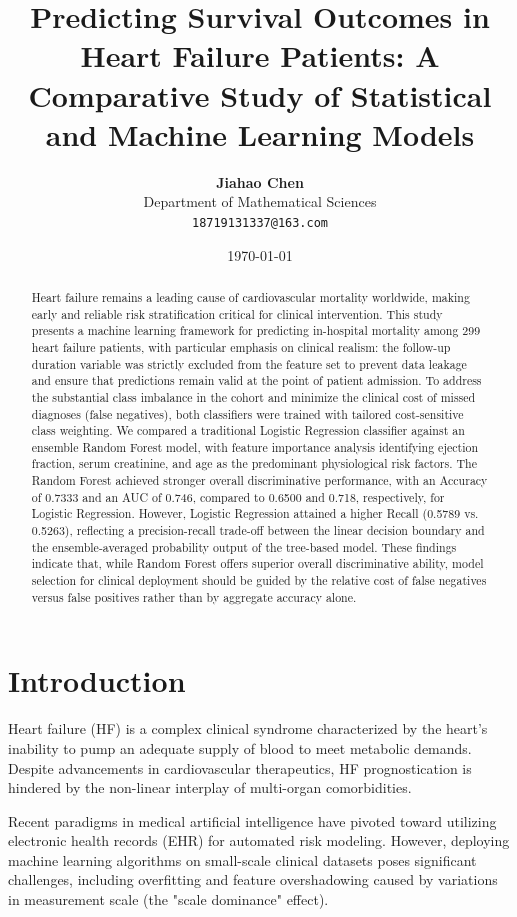 \documentclass[11pt]{article} %
\title{\textbf{Predicting Survival Outcomes in Heart Failure Patients: A Comparative Study of Statistical and Machine Learning Models}}
\author{
    \textbf{Jiahao Chen} \\
    Department of Mathematical Sciences \\
    \texttt{18719131337@163.com}
}
\date{\today}
\begin{document}
\maketitle

\begin{abstract}
Heart failure remains a leading cause of cardiovascular mortality worldwide, making early and reliable risk stratification critical for clinical intervention. This study presents a machine learning framework for predicting in-hospital mortality among 299 heart failure patients, with particular emphasis on clinical realism: the follow-up duration variable was strictly excluded from the feature set to prevent data leakage and ensure that predictions remain valid at the point of patient admission. To address the substantial class imbalance in the cohort and minimize the clinical cost of missed diagnoses (false negatives), both classifiers were trained with tailored cost-sensitive class weighting. We compared a traditional Logistic Regression classifier against an ensemble Random Forest model, with feature importance analysis identifying ejection fraction, serum creatinine, and age as the predominant physiological risk factors. The Random Forest achieved stronger overall discriminative performance, with an Accuracy of 0.7333 and an AUC of 0.746, compared to 0.6500 and 0.718, respectively, for Logistic Regression. However, Logistic Regression attained a higher Recall (0.5789 vs. 0.5263), reflecting a precision-recall trade-off between the linear decision boundary and the ensemble-averaged probability output of the tree-based model. These findings indicate that, while Random Forest offers superior overall discriminative ability, model selection for clinical deployment should be guided by the relative cost of false negatives versus false positives rather than by aggregate accuracy alone.
\end{abstract}

\section{Introduction}
Heart failure (HF) is a complex clinical syndrome characterized by the heart's inability to pump an adequate supply of blood to meet metabolic demands. Despite advancements in cardiovascular therapeutics, HF prognostication is hindered by the non-linear interplay of multi-organ comorbidities. 

Recent paradigms in medical artificial intelligence have pivoted toward utilizing electronic health records (EHR) for automated risk modeling. However, deploying machine learning algorithms on small-scale clinical datasets poses significant challenges, including overfitting and feature overshadowing caused by variations in measurement scale (the "scale dominance" effect).
\end{document}
